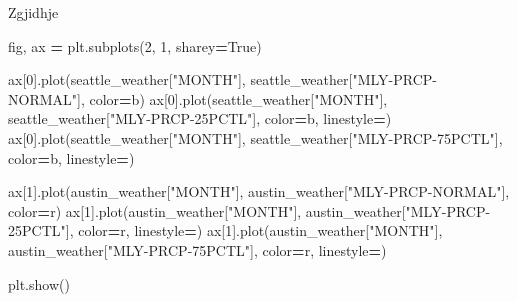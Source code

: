 \documentclass[
  ignorenonframetext,
]{beamer}
\newenvironment{Shaded}{\begin{snugshade}}{\end{snugshade}}
\newcommand{\DecValTok}[1]{\textcolor[rgb]{0.00,0.00,0.81}{#1}}
\newcommand{\NormalTok}[1]{#1}
\newcommand{\OperatorTok}[1]{\textcolor[rgb]{0.81,0.36,0.00}{\textbf{#1}}}
\newcommand{\StringTok}[1]{\textcolor[rgb]{0.31,0.60,0.02}{#1}}
\newcommand{\VariableTok}[1]{\textcolor[rgb]{0.00,0.00,0.00}{#1}}
\begin{document}
\begin{frame}[fragile]{Zgjidhje}
\protect\hypertarget{zgjidhje-5}{}

\begin{Shaded}
\begin{Highlighting}[]
\NormalTok{fig, ax }\OperatorTok{=}\NormalTok{ plt.subplots(}\DecValTok{2}\NormalTok{, }\DecValTok{1}\NormalTok{, sharey}\OperatorTok{=}\VariableTok{True}\NormalTok{)}


\NormalTok{ax[}\DecValTok{0}\NormalTok{].plot(seattle\_weather[}\StringTok{"MONTH"}\NormalTok{], seattle\_weather[}\StringTok{"MLY{-}PRCP{-}NORMAL"}\NormalTok{], color}\OperatorTok{=}\StringTok{\textquotesingle{}b\textquotesingle{}}\NormalTok{)}
\NormalTok{ax[}\DecValTok{0}\NormalTok{].plot(seattle\_weather[}\StringTok{"MONTH"}\NormalTok{], seattle\_weather[}\StringTok{"MLY{-}PRCP{-}25PCTL"}\NormalTok{], color}\OperatorTok{=}\StringTok{\textquotesingle{}b\textquotesingle{}}\NormalTok{, linestyle}\OperatorTok{=}\StringTok{\textquotesingle{}{-}{-}\textquotesingle{}}\NormalTok{)}
\NormalTok{ax[}\DecValTok{0}\NormalTok{].plot(seattle\_weather[}\StringTok{"MONTH"}\NormalTok{], seattle\_weather[}\StringTok{"MLY{-}PRCP{-}75PCTL"}\NormalTok{], color}\OperatorTok{=}\StringTok{\textquotesingle{}b\textquotesingle{}}\NormalTok{, linestyle}\OperatorTok{=}\StringTok{\textquotesingle{}{-}{-}\textquotesingle{}}\NormalTok{)}


\NormalTok{ax[}\DecValTok{1}\NormalTok{].plot(austin\_weather[}\StringTok{"MONTH"}\NormalTok{], austin\_weather[}\StringTok{"MLY{-}PRCP{-}NORMAL"}\NormalTok{], color}\OperatorTok{=}\StringTok{\textquotesingle{}r\textquotesingle{}}\NormalTok{)}
\NormalTok{ax[}\DecValTok{1}\NormalTok{].plot(austin\_weather[}\StringTok{"MONTH"}\NormalTok{], austin\_weather[}\StringTok{"MLY{-}PRCP{-}25PCTL"}\NormalTok{], color}\OperatorTok{=}\StringTok{\textquotesingle{}r\textquotesingle{}}\NormalTok{, linestyle}\OperatorTok{=}\StringTok{\textquotesingle{}{-}{-}\textquotesingle{}}\NormalTok{)}
\NormalTok{ax[}\DecValTok{1}\NormalTok{].plot(austin\_weather[}\StringTok{"MONTH"}\NormalTok{], austin\_weather[}\StringTok{"MLY{-}PRCP{-}75PCTL"}\NormalTok{], color}\OperatorTok{=}\StringTok{\textquotesingle{}r\textquotesingle{}}\NormalTok{, linestyle}\OperatorTok{=}\StringTok{\textquotesingle{}{-}{-}\textquotesingle{}}\NormalTok{)}

\NormalTok{plt.show()}
\end{Highlighting}
\end{Shaded}
\end{frame}
\end{document}
